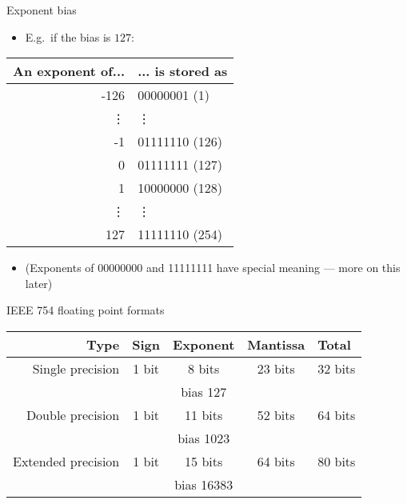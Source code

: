 \begin{frame}{Exponent bias}
	\begin{itemize}
		\pause\item E.g.\ if the bias is $127$:
	\end{itemize}
	\pause
	\begin{center}
		\begin{tabular}{|r|l|}
			\hline
			An exponent of... & ... is stored as \\\hline
			-126 & 00000001 (1) \\
			\vdots & \vdots \\
			-1 & 01111110 (126) \\
			0 & 01111111 (127) \\
			1 & 10000000 (128) \\
			\vdots & \vdots \\
			127 & 11111110 (254) \\\hline
		\end{tabular}
	\end{center}
	\begin{itemize}
		\pause\item (Exponents of 00000000 and 11111111 have special meaning --- more on this later)
	\end{itemize}
\end{frame}

\begin{frame}[fragile]{IEEE 754 floating point formats}
	\begin{center}
		\begin{tabular}{|r|ccc|l|}
			\hline
			Type & Sign & Exponent & Mantissa & Total \\\hline
			Single precision & 1 bit & 8 bits & 23 bits & 32 bits \\
			&& bias 127 && \\\hline
			Double precision & 1 bit & 11 bits & 52 bits & 64 bits \\
			&& bias 1023 && \\\hline
			Extended precision & 1 bit & 15 bits & 64 bits & 80 bits \\
			&& bias 16383 && \\\hline
		\end{tabular}
	\end{center}
\end{frame}

